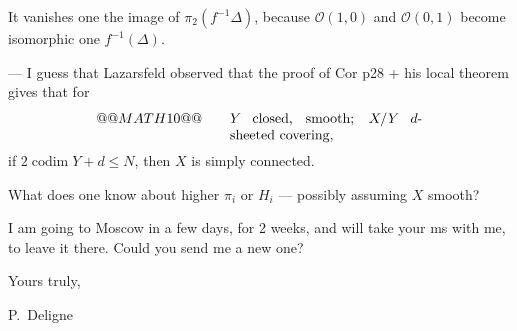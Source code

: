 \documentclass[11pt,a4paper]{article}
\theoremstyle{plain}
\theoremstyle{definition}
\DeclareMathOperator{\codim}{codim}
\begin{document}
It vanishes one the image of $\pi_2(f^{-1}\Delta)$, because $\mathcal{O}(1,0)$ and $\mathcal{O}(0,1)$ become isomorphic one $f^{-1}(\Delta)$.

\medskip

--- I guess that Lazarsfeld observed that the proof of Cor p28 + his local theorem gives that for
\[
@@MATH10@@
\qquad
\begin{minipage}[t]{0.4\textwidth}
$Y$ closed, smooth; $X/Y$ $d$-sheeted covering,
\end{minipage}
\]
if $2\codim Y + d \leq N$, then $X$ is simply connected.

What does one know about higher $\pi_i$ or $H_i$ --- possibly assuming $X$ smooth?

\vspace{1cm}

I am going to Moscow in a few days, for 2 weeks, and will take your ms with me, to leave it there. Could you send me a new one?

\vspace{1cm}

\begin{flushright}
Yours truly,

P.~Deligne
\end{flushright}
\end{document}
